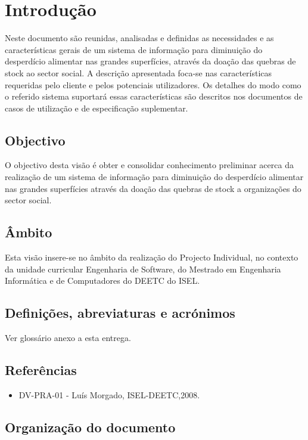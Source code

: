 \section{Introdução}

Neste documento são reunidas, analisadas e definidas as necessidades e as características gerais de um sistema de informação para diminuição do desperdício alimentar nas grandes superfícies, através da doação das quebras de stock ao sector social. A descrição apresentada foca-se nas características requeridas pelo cliente e pelos potenciais utilizadores. Os detalhes do modo como o referido sistema suportará essas características são descritos nos documentos de casos de utilização e de especificação suplementar.

\subsection{Objectivo}
O objectivo desta visão é obter e consolidar conhecimento preliminar acerca da realização de um sistema de informação para diminuição do desperdício alimentar nas grandes superfícies através da doação das quebras de stock a organizações do sector social.

\subsection{Âmbito}
Esta visão insere-se no âmbito da realização do Projecto Individual, no contexto da unidade curricular Engenharia de Software, do Mestrado em Engenharia Informática e de Computadores do DEETC do ISEL.

\subsection{Definições, abreviaturas e acrónimos}
Ver glossário anexo a esta entrega.

\subsection{Referências}
\begin{itemize}
	\item DV-PRA-01 - Luís Morgado, ISEL-DEETC,2008.
\end{itemize}
\subsection{Organização do documento}

